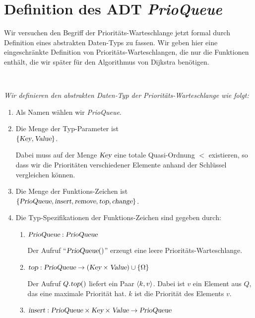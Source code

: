 \section{Definition des ADT \textsl{PrioQueue}}
Wir versuchen den Begriff der Priorit\"ats-Warteschlange jetzt formal durch Definition eines
abstrakten Daten-Typs zu fassen.
Wir geben hier eine eingeschr\"ankte Definition von Priorit\"ats-Warteschlangen, die nur die
Funktionen enth\"alt, die wir sp\"ater f\"ur den Algorithmus von Dijkstra ben\"otigen.
\begin{Definition} \hspace*{\fill} \\
{\em
  Wir definieren den abstrakten Daten-Typ der \emph{Priorit\"ats-Warteschlange} wie folgt:
  \begin{enumerate}
  \item Als Namen w\"ahlen wir \textsl{PrioQueue}.
  \item Die Menge der Typ-Parameter ist \\[0.1cm]
        \hspace*{1.3cm} $\{ \textsl{Key}, \textsl{Value} \}$.

        Dabei muss auf der Menge $\textsl{Key}$ eine totale Quasi-Ordnung $<$ existieren,
        so dass wir die Priorit\"aten verschiedener Elemente anhand der Schl\"ussel
        vergleichen k\"onnen. 
  \item Die Menge der Funktions-Zeichen ist \\[0.1cm]
       \hspace*{1.3cm} 
       $\{ \textsl{PrioQueue}, \textsl{insert}, \textsl{remove}, \textsl{top}, \textsl{change} \}$.
  \item Die Typ-Spezifikationen der Funktions-Zeichen sind gegeben durch:
        \begin{enumerate}
        \item $\textsl{PrioQueue}: \textsl{PrioQueue}$

              Der Aufruf ``$\textsl{PrioQueue}()$'' erzeugt eine leere
              Priorit\"ats-Warteschlange. 
        \item $\textsl{top}: \textsl{PrioQueue}  \rightarrow (\textsl{Key} \times \textsl{Value}) \cup \{\Omega\}$

              Der Aufruf $Q.\textsl{top}()$ liefert ein Paar $\pair(k,v)$.  Dabei ist $v$ ein Element
              aus $Q$, das eine maximale Priorit\"at hat. $k$ ist die Priorit\"at des Elements $v$.
        \item $\textsl{insert}: \textsl{PrioQueue} \times \textsl{Key} \times \textsl{Value} \rightarrow \textsl{PrioQueue}$


\end{enumerate}
\end{enumerate}}
\end{Definition}
